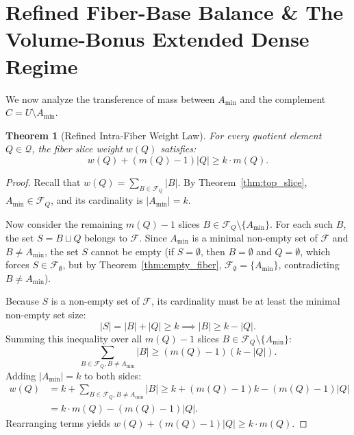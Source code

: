 \documentclass[11pt,a4paper]{article}
\theoremstyle{plain}
\newtheorem{theorem}{Theorem}[section]
\theoremstyle{definition}
\theoremstyle{remark}
\newcommand{\F}{\mathcal{F}}
\newcommand{\Q}{\mathcal{Q}}
\begin{document}
\section{Refined Fiber-Base Balance \& The Volume-Bonus Extended Dense Regime}\label{sec:balance}

We now analyze the transference of mass between $A_{\min}$ and the complement $C = U \setminus A_{\min}$.

\begin{theorem}[Refined Intra-Fiber Weight Law]\label{thm:refined_intra_weight}
For every quotient element $Q \in \Q$, the fiber slice weight $w(Q)$ satisfies:
\begin{equation}
w(Q) + (m(Q) - 1)|Q| \ge k \cdot m(Q).
\end{equation}
\end{theorem}
\begin{proof}
Recall that $w(Q) = \sum_{B \in \F_Q} |B|$. By Theorem~\ref{thm:top_slice}, $A_{\min} \in \F_Q$, and its cardinality is $|A_{\min}| = k$.

Now consider the remaining $m(Q) - 1$ slices $B \in \F_Q \setminus \{A_{\min}\}$. For each such $B$, the set $S = B \sqcup Q$ belongs to $\F$. Since $A_{\min}$ is a minimal non-empty set of $\F$ and $B \ne A_{\min}$, the set $S$ cannot be empty (if $S = \emptyset$, then $B = \emptyset$ and $Q = \emptyset$, which forces $S \in \F_\emptyset$, but by Theorem~\ref{thm:empty_fiber}, $\F_\emptyset = \{A_{\min}\}$, contradicting $B \ne A_{\min}$).

Because $S$ is a non-empty set of $\F$, its cardinality must be at least the minimal non-empty set size:
\begin{equation}
|S| = |B| + |Q| \ge k \implies |B| \ge k - |Q|.
\end{equation}
Summing this inequality over all $m(Q) - 1$ slices $B \in \F_Q \setminus \{A_{\min}\}$:
\begin{equation}
\sum_{B \in \F_Q, B \ne A_{\min}} |B| \ge (m(Q) - 1)(k - |Q|).
\end{equation}
Adding $|A_{\min}| = k$ to both sides:
\begin{align}
w(Q) &= k + \sum_{B \in \F_Q, B \ne A_{\min}} |B| \ge k + (m(Q) - 1)k - (m(Q) - 1)|Q| \nonumber \\
&= k \cdot m(Q) - (m(Q) - 1)|Q|.
\end{align}
Rearranging terms yields $w(Q) + (m(Q) - 1)|Q| \ge k \cdot m(Q)$.
\end{proof}
\end{document}
